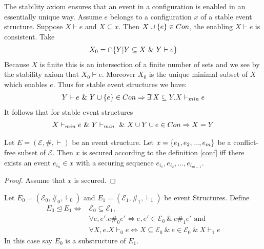 \documentclass{article}
\begin{document}
The stability axiom ensures that an event in a configuration is
enabled in an essentially unique way.
Assume $e$ belongs to a configuration $x$ of a stable event structure.
Suppose $X \vdash e$ and $X \subseteq x$.
Then $X \cup \{e\} \in Con$, the enabling $X\vdash e$ is consistent.
Take
\begin{align*}
    X_0 = \cap \{Y | Y \subseteq X \ \& \  Y \vdash e\}
\end{align*}
Because $X$ is finite this is an intersection of a finite number of
sets and we see by the stability axiom that $X_0 \vdash e$.
Moreover $X_0$ is the unique minimal subset of $X$ which enables $e$.
Thus for stable event structures we have:
\begin{align*}
    Y \vdash e \ \& \  Y \cup \{e\} \in Con \Rightarrow
    \exists ! X \subseteq Y.X \vdash_{min} e
\end{align*}
It follows that for stable event structures
\begin{align*}
    X \vdash_{min} e \ \& \  Y \vdash_{min} \ \& \ 
    X \cup Y \cup e \in Con \Rightarrow X = Y
\end{align*}

\begin{theorem}
    Let $E = (\mathcal{E}, \#, \vdash)$ be an event structure.
    Let $x = \{e_1,e_2,...,e_m\}$ be a conflict-free subset of $\mathcal{E}$.
    Then $x$ is secured according to the definition \ref{conf} iff
    there exists an event $e_{i_n} \in x$ with a securing sequence $e_{i_1},e_{i_2},...,e_{i_{m-1}}$.

    \begin{proof}
        Assume that $x$ is secured. 
    \end{proof}

\end{theorem}

\begin{definition}
    Let $E_0 = (\mathcal{E}_0,\#_0,\vdash_0)$ and $E_1 = (\mathcal{E}_1,\#_1,\vdash_1)$
    be event Structures. Define
    \begin{align*}
        E_0 \trianglelefteq E_1 \iff & \mathcal{E}_0 \subseteq \mathcal{E}_1,                                          \\
                                     & \forall e,e'. e\#_0e'  \iff e,e' \in \mathcal{E}_0 \ \& \ e\#_1 e' \text{ and } \\
                                     & \forall X,e.X\vdash_0 e  \iff X \subseteq \mathcal{E}_0
        \ \& \ e \in \mathcal{E}_0\ \& \ X \vdash_1 e
    \end{align*}
    In this case say $E_0$ is a substructure of $E_1$.
\end{definition}
\end{document}
